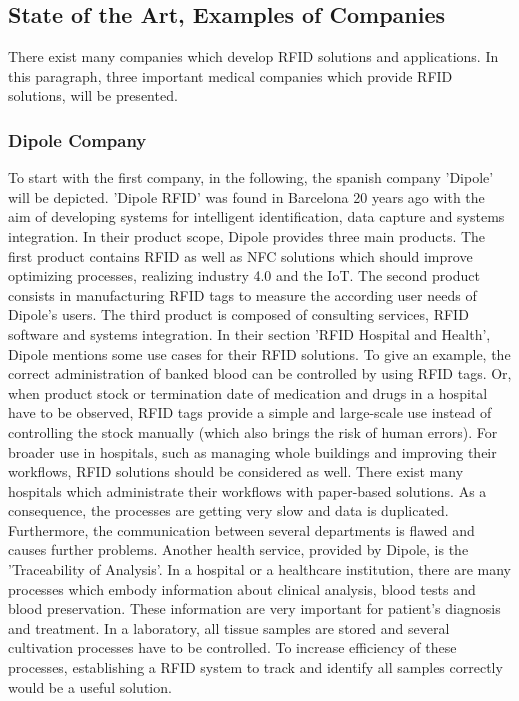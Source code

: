 \subsection{State of the Art, Examples of Companies}

There exist many companies which develop RFID solutions and applications. In this paragraph, three important medical companies which provide RFID solutions, will be presented.

\subsubsection{Dipole Company}

To start with the first company, in the following, the spanish company 'Dipole' \cite{dipole} will be depicted. 'Dipole RFID' was found in Barcelona 20 years ago with the aim of developing systems for intelligent identification, data capture and systems integration. In their product scope, Dipole provides three main products. The first product contains RFID as well as \ac{NFC} solutions which should improve optimizing processes, realizing industry 4.0 and the IoT. The second product consists in manufacturing RFID tags to measure the according user needs of Dipole's users. The third product is composed of consulting services, RFID software and systems integration.
In their section 'RFID Hospital and Health', Dipole mentions some use cases for their RFID solutions. To give an example, the correct administration of banked blood can be controlled by using RFID tags. Or, when product stock or termination date of medication and drugs in a hospital have to be observed, RFID tags provide a simple and large-scale use instead of controlling the stock manually (which also brings the risk of human errors). For broader use in hospitals, such as managing whole buildings and improving their workflows, RFID solutions should be considered as well. There exist many hospitals which administrate their workflows with paper-based solutions. As a consequence, the processes are getting very slow and data is duplicated. Furthermore, the communication between several departments is flawed and causes further problems.
Another health service, provided by Dipole, is the 'Traceability of Analysis'. In a hospital or a healthcare institution, there are many processes which embody information about clinical analysis, blood tests and blood preservation. These information are very important for patient's diagnosis and treatment. In a laboratory, all tissue samples are stored and several cultivation processes have to be controlled. To increase efficiency of these processes, establishing a RFID system to track and identify all samples correctly would be a useful solution.

